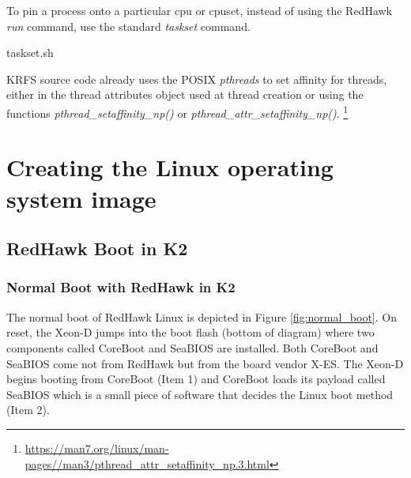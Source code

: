 \documentclass[12pt]{article}
\begin{document}
To pin a process onto a particular cpu or cpuset, instead of using the RedHawk
\emph{run} command, use the standard \emph{taskset} command.

\vspace{0.8cm}
\lstset{
    language=bash,
    basicstyle=\footnotesize\ttfamily,
    linewidth=6in,
    showstringspaces=false,
    keywordstyle=\ttfamily
}
\begin{adjustwidth}{0.0in}{0.0in}
\begin{lstinputlisting}[caption={Use taskset instead of run},
label={lst:taskset_cmd}]{taskset.sh}

\end{lstinputlisting}
\end{adjustwidth}
\vspace{0.8cm}

KRFS source code already uses the POSIX \emph{pthreads} to set affinity for
threads, either in the thread attributes object used at thread creation or using
the functions \emph{pthread\_setaffinity\_np()} or
\emph{pthread\_attr\_setaffinity\_np()}.%
\footnote{\url{https://man7.org/linux/man-pages//man3/pthread_attr_setaffinity_np.3.html}}


%
\newpage
\section{Creating the Linux operating system image}
\label{sec:image_creation}


\subsection{RedHawk Boot in K2}

\subsubsection{Normal Boot with RedHawk in K2}
The normal boot of RedHawk Linux is depicted in Figure \ref{fig:normal_boot}.
On reset, the Xeon-D jumps into the boot flash (bottom of diagram) where two
components called CoreBoot and SeaBIOS are installed.  Both CoreBoot and SeaBIOS
come not from RedHawk but from the board vendor X-ES.  The Xeon-D begins
booting from CoreBoot (Item 1) and  CoreBoot loads its payload called SeaBIOS which
is a small piece of software that decides the Linux boot method (Item 2).
\end{document}
